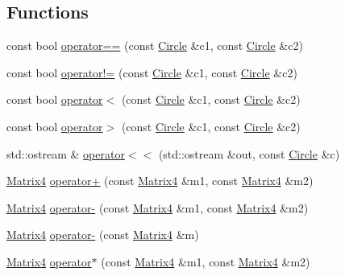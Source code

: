 \subsection*{Functions}
\begin{DoxyCompactItemize}
\item 
const bool \hyperlink{namespaceprism_1_1geometry_ac67ac136adcae1060ebfdfe1f435f5d2}{operator==} (const \hyperlink{classprism_1_1geometry_1_1_circle}{Circle} \&c1, const \hyperlink{classprism_1_1geometry_1_1_circle}{Circle} \&c2)
\item 
const bool \hyperlink{namespaceprism_1_1geometry_abf328df6552ac8239e51be0d4f1f1321}{operator!=} (const \hyperlink{classprism_1_1geometry_1_1_circle}{Circle} \&c1, const \hyperlink{classprism_1_1geometry_1_1_circle}{Circle} \&c2)
\item 
const bool \hyperlink{namespaceprism_1_1geometry_af3150660cd5ee7e4505f84ecced7e92f}{operator$<$} (const \hyperlink{classprism_1_1geometry_1_1_circle}{Circle} \&c1, const \hyperlink{classprism_1_1geometry_1_1_circle}{Circle} \&c2)
\item 
const bool \hyperlink{namespaceprism_1_1geometry_a02413cdec14bfc4955d81920c45d49f9}{operator$>$} (const \hyperlink{classprism_1_1geometry_1_1_circle}{Circle} \&c1, const \hyperlink{classprism_1_1geometry_1_1_circle}{Circle} \&c2)
\item 
std\+::ostream \& \hyperlink{namespaceprism_1_1geometry_aff6452600b2cfbd82c418a356b5ac776}{operator$<$$<$} (std\+::ostream \&out, const \hyperlink{classprism_1_1geometry_1_1_circle}{Circle} \&c)
\item 
\hyperlink{classprism_1_1geometry_1_1_matrix4}{Matrix4} \hyperlink{namespaceprism_1_1geometry_a2fedfb159ab9b651b8fc309e41b507db}{operator+} (const \hyperlink{classprism_1_1geometry_1_1_matrix4}{Matrix4} \&m1, const \hyperlink{classprism_1_1geometry_1_1_matrix4}{Matrix4} \&m2)
\item 
\hyperlink{classprism_1_1geometry_1_1_matrix4}{Matrix4} \hyperlink{namespaceprism_1_1geometry_aa88d3484d2ee19a8db3ac436e5638325}{operator-\/} (const \hyperlink{classprism_1_1geometry_1_1_matrix4}{Matrix4} \&m1, const \hyperlink{classprism_1_1geometry_1_1_matrix4}{Matrix4} \&m2)
\item 
\hyperlink{classprism_1_1geometry_1_1_matrix4}{Matrix4} \hyperlink{namespaceprism_1_1geometry_acebff1db0d70564af715fbf9818aa1bf}{operator-\/} (const \hyperlink{classprism_1_1geometry_1_1_matrix4}{Matrix4} \&m)
\item 
\hyperlink{classprism_1_1geometry_1_1_matrix4}{Matrix4} \hyperlink{namespaceprism_1_1geometry_a088357a2f0b61232578a4f1a269c50a6}{operator$\ast$} (const \hyperlink{classprism_1_1geometry_1_1_matrix4}{Matrix4} \&m1, const \hyperlink{classprism_1_1geometry_1_1_matrix4}{Matrix4} \&m2)

\end{DoxyCompactItemize}

